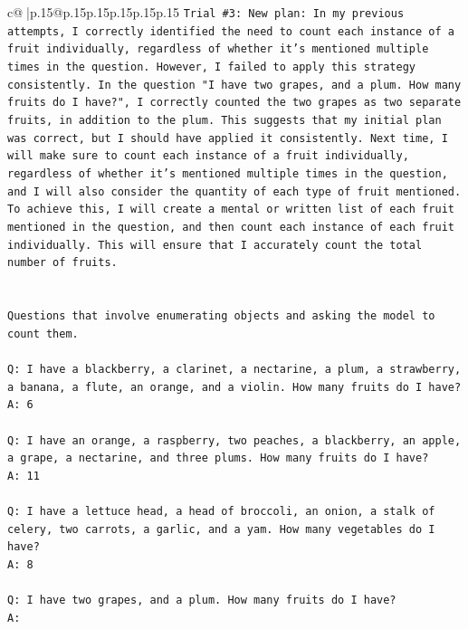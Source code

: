 \documentclass{article}
\begin{document}
{\begin{supertabular}{c@{$\;$}|p{.15\linewidth}@{}p{.15\linewidth}p{.15\linewidth}p{.15\linewidth}p{.15\linewidth}p{.15\linewidth}}
{{{\texttt{Trial \#3: New plan: In my previous attempts, I correctly identified the need to count each instance of a fruit individually, regardless of whether it's mentioned multiple times in the question. However, I failed to apply this strategy consistently. In the question "I have two grapes, and a plum. How many fruits do I have?", I correctly counted the two grapes as two separate fruits, in addition to the plum. This suggests that my initial plan was correct, but I should have applied it consistently. Next time, I will make sure to count each instance of a fruit individually, regardless of whether it's mentioned multiple times in the question, and I will also consider the quantity of each type of fruit mentioned. To achieve this, I will create a mental or written list of each fruit mentioned in the question, and then count each instance of each fruit individually. This will ensure that I accurately count the total number of fruits.} \\
\\ 
\\ 
\texttt{Questions that involve enumerating objects and asking the model to count them.} \\
\\ 
\texttt{Q: I have a blackberry, a clarinet, a nectarine, a plum, a strawberry, a banana, a flute, an orange, and a violin. How many fruits do I have?} \\
\texttt{A: 6} \\
\\ 
\texttt{Q: I have an orange, a raspberry, two peaches, a blackberry, an apple, a grape, a nectarine, and three plums. How many fruits do I have?} \\
\texttt{A: 11} \\
\\ 
\texttt{Q: I have a lettuce head, a head of broccoli, an onion, a stalk of celery, two carrots, a garlic, and a yam. How many vegetables do I have?} \\
\texttt{A: 8} \\
\\ 
\texttt{Q: I have two grapes, and a plum. How many fruits do I have?} \\
\texttt{A:} \\
            }
        }
    }
     \\ \\


\end{supertabular}}
\end{document}

